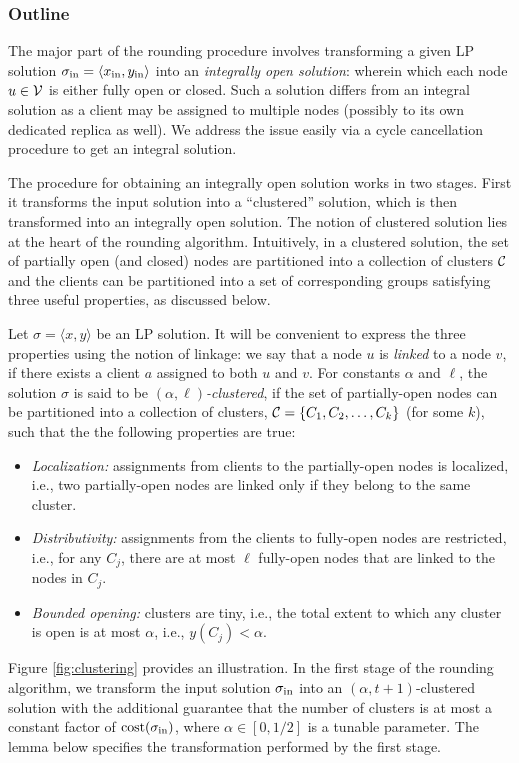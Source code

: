 \documentclass[11pt]{article}
\newcommand{\mypara}[1] {\subsubsection*{#1}}
\newcommand{\calC} {{\cal C}}
\newcommand{\calV} {{\cal V}}
\newcommand{\myin} {{\rm in}}
\newcommand{\sigmain} {\sigma_{\myin}}
\newcommand{\pair}[2] {\langle #1, #2\rangle}
\newcommand{\xin} {x_{\myin}}
\newcommand{\yin} {y_{\myin}}
\newcommand{\cost} {{\rm cost}}
\begin{document}
\mypara{Outline}
The major part of the rounding procedure involves transforming a
given LP solution $\sigmain=\pair{\xin}{\yin}$ into an {\em integrally open solution}:
wherein which each node $u\in \calV$ is either fully open or closed.
Such a solution differs from an integral solution as
a client may be assigned to multiple nodes (possibly to its own dedicated replica as well).
We address the issue easily via a cycle cancellation procedure to get
an integral solution.

The procedure for obtaining an integrally open solution works in two stages.
First it transforms the input solution into a ``clustered'' solution,
which is then transformed into an integrally open solution.
The notion of clustered solution lies at the heart of the rounding algorithm.
Intuitively, in a clustered solution, the set of partially open (and closed) nodes are partitioned into a collection of clusters $\calC$
and the clients can be partitioned into a set of corresponding groups satisfying three useful properties, as discussed below.

Let $\sigma =\pair{x}{y}$ be an LP solution. 
It will be convenient to express the three properties using the notion of linkage:
we say that a node $u$ is {\em linked} to a node $v$, if there exists a client $a$ assigned to both $u$ and $v$.
For constants $\alpha$ and $\ell$, the solution $\sigma$ is said to be {\em $(\alpha, \ell)$-clustered},
if the set of partially-open nodes can be partitioned into a collection of clusters,
$\calC =\{C_1, C_2, \ldots, C_k\}$ (for some $k$),
such that the the following properties are true:
\begin{itemize}
	\item {\it Localization: }assignments from clients to the partially-open nodes is localized, i.e., two partially-open nodes are linked only if they belong to the same cluster.
	\item {\it Distributivity: }assignments from the clients to fully-open nodes are restricted, i.e., for any $C_j$, there are at most $\ell$ fully-open nodes that are linked to the nodes in $C_j$.
	\item {\it Bounded opening: }clusters are tiny, i.e., the total extent to which any cluster is open is at most $\alpha$, i.e., $y(C_j) < \alpha$.
\end{itemize}
Figure \ref{fig:clustering} provides an illustration.
In the first stage of the rounding algorithm, we transform the input solution $\sigmain$ into an $(\alpha, t+1)$-clustered solution
with the additional guarantee that the number of clusters is at most a constant factor of $\cost(\sigmain)$,
where $\alpha\in [0,1/2]$ is a tunable parameter. The lemma below specifies the transformation performed by the first stage. 
\end{document}
